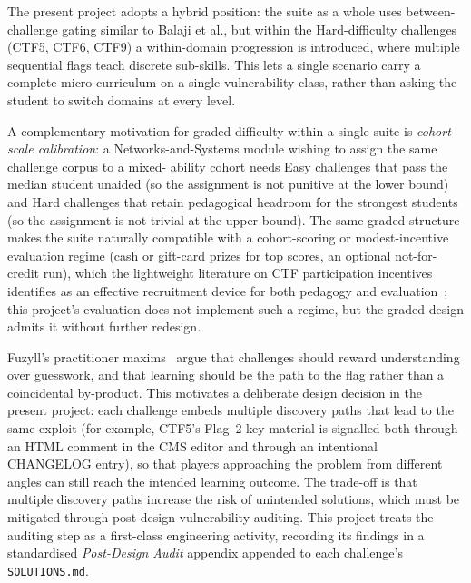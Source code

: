 The present project adopts a hybrid position: the suite as a whole
uses between-challenge gating similar to Balaji et al., but within
the Hard-difficulty challenges (CTF5, CTF6, CTF9) a within-domain
progression is introduced, where multiple sequential flags teach
discrete sub-skills. This lets a single scenario carry a complete
micro-curriculum on a single vulnerability class, rather than
asking the student to switch domains at every level.

A complementary motivation for graded difficulty within a single
suite is \textit{cohort-scale calibration}: a Networks-and-Systems
module wishing to assign the same challenge corpus to a mixed-
ability cohort needs Easy challenges that pass the median student
unaided (so the assignment is not punitive at the lower bound) and
Hard challenges that retain pedagogical headroom for the strongest
students (so the assignment is not trivial at the upper bound).
The same graded structure makes the suite naturally compatible
with a cohort-scoring or modest-incentive evaluation regime
(cash or gift-card prizes for top scores, an optional
not-for-credit run), which the lightweight literature on CTF
participation incentives identifies as an effective recruitment
device for both pedagogy and evaluation~\cite{Vykopal}; this
project's evaluation does not implement such a regime, but the
graded design admits it without further redesign.

Fuzyll's practitioner maxims~\cite{Fuzyll2015} argue that challenges
should reward understanding over guesswork, and that learning
should be the path to the flag rather than a coincidental by-product.
This motivates a deliberate design decision in the present project:
each challenge embeds multiple discovery paths that lead to the
same exploit (for example, CTF5's Flag~2 key material is signalled
both through an HTML comment in the CMS editor and through an
intentional CHANGELOG entry), so that players approaching the
problem from different angles can still reach the intended learning
outcome. The trade-off is that multiple discovery paths increase
the risk of unintended solutions, which must be mitigated through
post-design vulnerability auditing. This project treats the auditing
step as a first-class engineering activity, recording its findings
in a standardised \textit{Post-Design Audit} appendix appended to
each challenge's \texttt{SOLUTIONS.md}.


